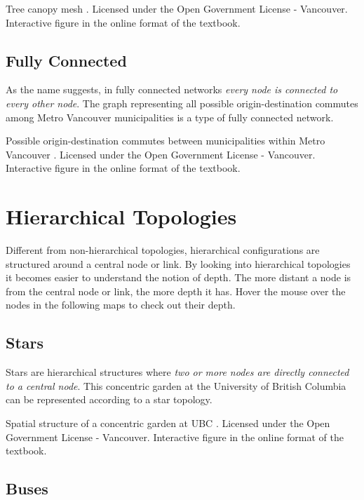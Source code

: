\documentclass[
]{book}
\begin{document}
\label{fig:8-tree-canopy-mesh}Tree canopy mesh \citep{city_of_vancouver_open_nodate}. Licensed under the Open Government License - Vancouver. Interactive figure in the online format of the textbook.

\subsection{Fully Connected}\label{fully-connected}

As the name suggests, in fully connected networks \emph{every node is connected to every other node}. The graph representing all possible origin-destination commutes among Metro Vancouver municipalities is a type of fully connected network.

\label{fig:8-origin-destination}Possible origin-destination commutes between municipalities within Metro Vancouver \citep{city_of_vancouver_open_nodate}. Licensed under the Open Government License - Vancouver. Interactive figure in the online format of the textbook.

\section{Hierarchical Topologies}\label{hierarchical-topologies}

Different from non-hierarchical topologies, hierarchical configurations are structured around a central node or link.
By looking into hierarchical topologies it becomes easier to understand the notion of depth. The more distant a node is from the central node or link, the more depth it has. Hover the mouse over the nodes in the following maps to check out their depth.

\subsection{Stars}\label{stars}

Stars are hierarchical structures where \emph{two or more nodes are directly connected to a central node}. This concentric garden at the University of British Columbia can be represented according to a star topology.

\label{fig:8-spatial-structure-garden}Spatial structure of a concentric garden at UBC \citep{city_of_vancouver_open_nodate}. Licensed under the Open Government License - Vancouver. Interactive figure in the online format of the textbook.

\subsection{Buses}\label{buses}
\end{document}
